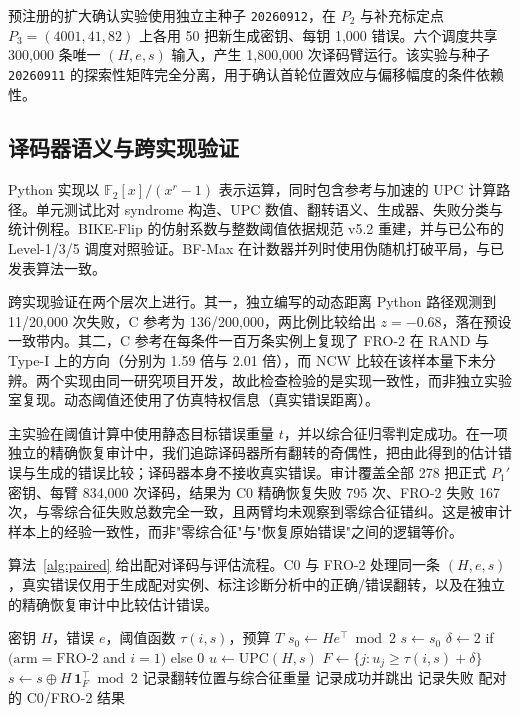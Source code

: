 \documentclass[UTF8,a4paper,10pt,twocolumn]{ctexart}
\begin{document}
预注册的扩大确认实验使用独立主种子 \texttt{20260912}，在 $P_2$ 与补充标定点 $P_3=(4001,41,82)$ 上各用 50 把新生成密钥、每钥 1{,}000 错误。六个调度共享 300{,}000 条唯一 $(H,e,s)$ 输入，产生 1{,}800{,}000 次译码臂运行。该实验与种子 \texttt{20260911} 的探索性矩阵完全分离，用于确认首轮位置效应与偏移幅度的条件依赖性。

\subsection{译码器语义与跨实现验证}

Python 实现以 $\mathbb{F}_2[x]/(x^r-1)$ 表示运算，同时包含参考与加速的 UPC 计算路径。单元测试比对 syndrome 构造、UPC 数值、翻转语义、生成器、失败分类与统计例程。BIKE-Flip 的仿射系数与整数阈值依据规范 v5.2 重建，并与已公布的 Level-1/3/5 调度对照验证。BF-Max 在计数器并列时使用伪随机打破平局，与已发表算法一致。

跨实现验证在两个层次上进行。其一，独立编写的动态距离 Python 路径观测到 11/20{,}000 次失败，C 参考为 136/200{,}000，两比例比较给出 $z=-0.68$，落在预设一致带内。其二，C 参考在每条件一百万条实例上复现了 FRO-2 在 RAND 与 Type-I 上的方向（分别为 1.59 倍与 2.01 倍），而 NCW 比较在该样本量下未分辨。两个实现由同一研究项目开发，故此检查检验的是实现一致性，而非独立实验室复现。动态阈值还使用了仿真特权信息（真实错误距离）。

主实验在阈值计算中使用静态目标错误重量 $t$，并以综合征归零判定成功。在一项独立的精确恢复审计中，我们追踪译码器所有翻转的奇偶性，把由此得到的估计错误与生成的错误比较；译码器本身不接收真实错误。审计覆盖全部 278 把正式 $P_1'$ 密钥、每臂 834{,}000 次译码，结果为 C0 精确恢复失败 795 次、FRO-2 失败 167 次，与零综合征失败总数完全一致，且两臂均未观察到零综合征错纠。这是被审计样本上的经验一致性，而非"零综合征"与"恢复原始错误"之间的逻辑等价。

算法~\ref{alg:paired} 给出配对译码与评估流程。C0 与 FRO-2 处理同一条 $(H,e,s)$，真实错误仅用于生成配对实例、标注诊断分析中的正确/错误翻转，以及在独立的精确恢复审计中比较估计错误。

\begin{algorithm}[t]
\caption{配对 C0/FRO-2 译码与评估}\label{alg:paired}
\begin{algorithmic}[1]
\Require 密钥 $H$，错误 $e$，阈值函数 $\tau(i,s)$，预算 $T$
\State $s_0 \gets H e^{\top} \bmod 2$ 
  \State $s\gets s_0$
    \State $\delta \gets 2$ if $(\mathrm{arm}=\mathrm{FRO\text{-}2}$ and $i=1)$ else $0$
    \State $u \gets \mathrm{UPC}(H,s)$
    \State $F \gets \{j: u_j \ge \tau(i,s)+\delta\}$
    \State $s \gets s \oplus H\,\mathbf{1}_F^{\top} \bmod 2$
    \State 记录翻转位置与综合征重量
     记录成功并跳出 \EndIf
  \EndFor
   记录失败 \EndIf
\EndFor
\State \Return 配对的 C0/FRO-2 结果
\end{algorithmic}
\end{algorithm}
\end{document}
